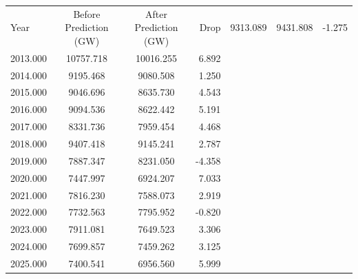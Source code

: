 \begin{tabular}{lccr}
\toprule
Year & Before Prediction (GW) & After Prediction (GW) & Drop%
 & 9313.089 & 9431.808 & -1.275 \\
2013.000 & 10757.718 & 10016.255 & 6.892 \\
2014.000 & 9195.468 & 9080.508 & 1.250 \\
2015.000 & 9046.696 & 8635.730 & 4.543 \\
2016.000 & 9094.536 & 8622.442 & 5.191 \\
2017.000 & 8331.736 & 7959.454 & 4.468 \\
2018.000 & 9407.418 & 9145.241 & 2.787 \\
2019.000 & 7887.347 & 8231.050 & -4.358 \\
2020.000 & 7447.997 & 6924.207 & 7.033 \\
2021.000 & 7816.230 & 7588.073 & 2.919 \\
2022.000 & 7732.563 & 7795.952 & -0.820 \\
2023.000 & 7911.081 & 7649.523 & 3.306 \\
2024.000 & 7699.857 & 7459.262 & 3.125 \\
2025.000 & 7400.541 & 6956.560 & 5.999 \\
\bottomrule
\end{tabular}
